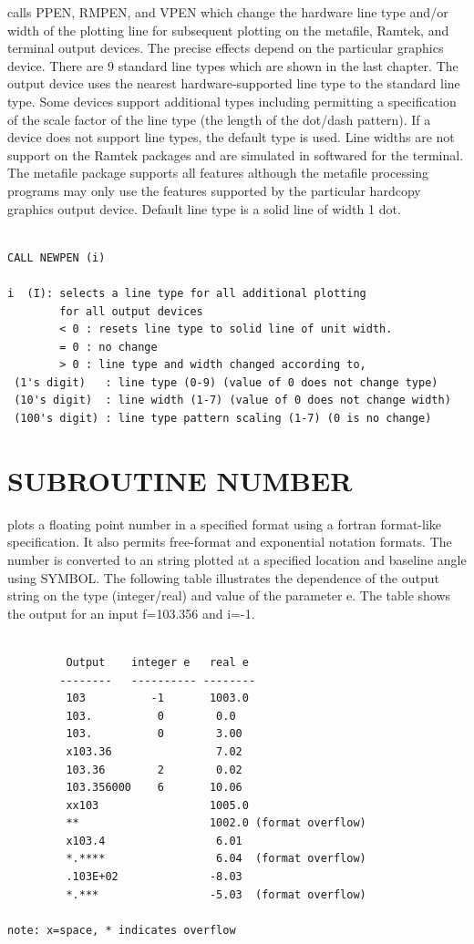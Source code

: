 \documentclass[11pt]{report}
\begin{document}
 calls PPEN, RMPEN, and VPEN which change the hardware line type
and/or width of the plotting line for subsequent plotting on the metafile,
Ramtek, and terminal output devices.  The precise effects depend on the
particular graphics device.  There are 9 standard line types which are 
shown in the last chapter.  The output device uses the nearest
hardware-supported line type to the standard line type.  Some
devices support additional types including permitting a specification
of the scale factor of the line type (the length of the dot/dash pattern).
If a device does not support line types, the default type is used.
Line widths are not support on the Ramtek packages and are simulated
in softwared for the terminal.  The metafile package supports all features
although the metafile processing programs may only use the
features supported by the particular hardcopy graphics output device.
Default line type is a solid line of width 1 dot.
\begin{verbatim}

CALL NEWPEN (i)

i  (I): selects a line type for all additional plotting
        for all output devices
        < 0 : resets line type to solid line of unit width.
        = 0 : no change
        > 0 : line type and width changed according to,
 (1's digit)   : line type (0-9) (value of 0 does not change type)
 (10's digit)  : line width (1-7) (value of 0 does not change width)
 (100's digit) : line type pattern scaling (1-7) (0 is no change)
\end{verbatim}

\section{SUBROUTINE NUMBER}

 plots a floating point number in a specified format using
a fortran format-like specification.  It also permits
free-format and exponential notation formats.  The number is converted
to an  string plotted at a specified location and baseline angle
using SYMBOL.  The following table illustrates the dependence of the output
string on the type (integer/real) and value of the parameter e.  The table
shows the output for an input f=103.356 and i=-1.

\begin{verbatim}

         Output    integer e   real e
        --------   ---------- --------
         103          -1       1003.0
         103.          0        0.0
         103.          0        3.00
         x103.36                7.02
         103.36        2        0.02
         103.356000    6       10.06
         xx103                 1005.0
         **                    1002.0 (format overflow)
         x103.4                 6.01
         *.****                 6.04  (format overflow)
         .103E+02              -8.03
         *.***                 -5.03  (format overflow)

note: x=space, * indicates overflow
\end{verbatim}
\end{document}
